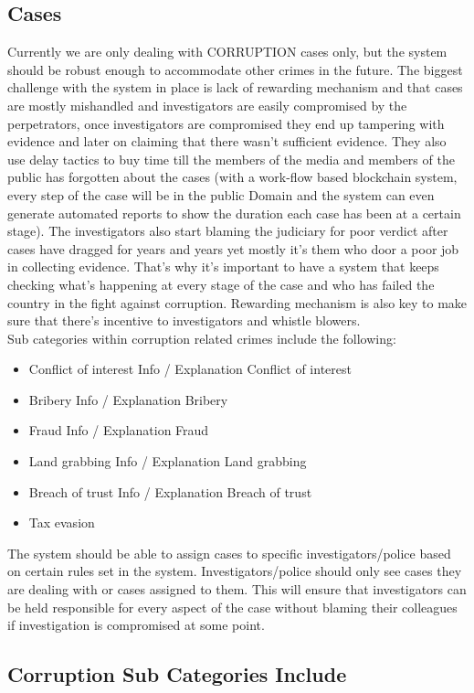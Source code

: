 \subsection{Cases}
Currently we are only dealing with CORRUPTION cases only, but the system should be robust enough to accommodate other crimes in the future. The biggest challenge with the system in place is lack of rewarding mechanism and that cases are mostly mishandled and investigators are easily compromised by the perpetrators, once investigators are compromised they end up tampering with evidence and later on claiming that there wasn’t sufficient evidence. They also use delay tactics to buy time till the members of the media and members of the public has forgotten about the cases (with a work-flow based blockchain system, every step of the case will be in the public Domain and the system can even generate automated reports to show the duration each case has been at a certain stage). The investigators also start blaming the judiciary for poor verdict after cases have dragged for years and years yet mostly it’s them who door a poor job in collecting evidence. That’s why it’s important to have a system that keeps checking what’s happening at every stage of the case and who has failed the country in the fight against corruption. Rewarding mechanism is also key to make sure that there’s incentive to investigators and whistle blowers.\\
Sub categories within corruption related crimes include the following:
\begin{itemize}
	\item Conflict of interest Info / Explanation Conflict of interest
	\item  Bribery Info / Explanation Bribery
	\item  Fraud Info / Explanation Fraud
	\item  Land grabbing Info / Explanation Land grabbing
	\item  Breach of trust Info / Explanation Breach of trust
	\item  Tax evasion
		
\end{itemize}
The system should be able to assign cases to specific investigators/police based on certain rules set in the system. Investigators/police should only see cases they are dealing with or cases assigned to them. This will ensure that investigators can be held responsible for every aspect of the case without blaming their colleagues if investigation is compromised at some point.
\subsection{Corruption Sub Categories Include}

